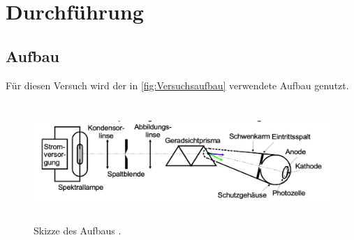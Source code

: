 \section{Durchführung}
\label{sec:Durchführung}
\subsection{Aufbau}
Für diesen Versuch wird der in \autoref{fig:Versuchsaufbau} verwendete Aufbau genutzt.
\begin{figure}
    \centering
    \includegraphics[height=4.5cm]{content/pics/Aufbau.pdf}
    \caption{Skizze des Aufbaus \cite{v500}.}
    \label{fig:Versuchsaufbau}
\end{figure}